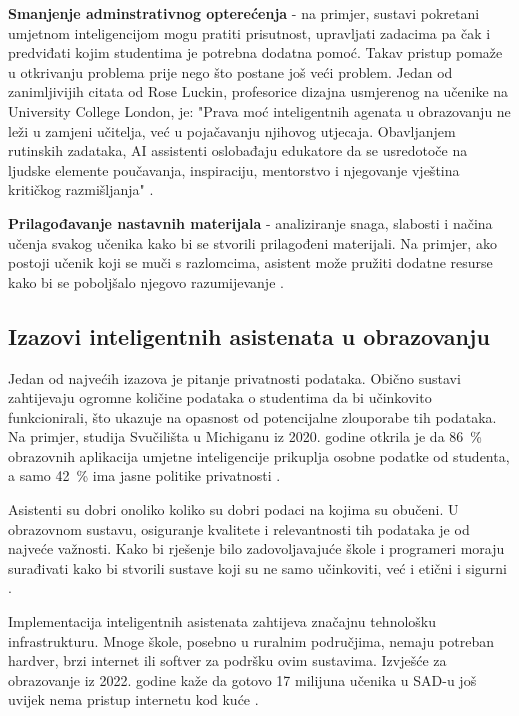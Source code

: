 \documentclass[]{foi}
\begin{document}
    \textbf{Smanjenje adminstrativnog opterećenja} - na primjer, sustavi pokretani umjetnom inteligencijom mogu pratiti prisutnost, upravljati zadacima pa čak i predviđati kojim
    studentima je potrebna dodatna pomoć. Takav pristup pomaže u otkrivanju problema prije nego što postane još veći problem. Jedan od zanimljivijih citata od Rose Luckin, profesorice dizajna
    usmjerenog na učenike na University College London, je: "Prava moć inteligentnih agenata u obrazovanju ne leži u zamjeni učitelja, već u pojačavanju njihovog utjecaja. Obavljanjem rutinskih
    zadataka, AI assistenti oslobađaju edukatore da se usredotoče na ljudske elemente poučavanja, inspiraciju, mentorstvo i njegovanje vještina kritičkog razmišljanja" \cite{weber2025smythos}. 
    
    
    \textbf{Prilagođavanje nastavnih materijala}   - analiziranje snaga, slabosti i načina učenja svakog učenika kako bi se stvorili prilagođeni materijali. Na primjer, ako postoji
    učenik koji se muči s razlomcima, asistent može pružiti dodatne resurse kako bi se poboljšalo njegovo razumijevanje \cite{weber2025smythos}.


\subsection{Izazovi inteligentnih asistenata u obrazovanju}

Jedan od najvećih izazova je pitanje privatnosti podataka. Obično sustavi zahtijevaju ogromne količine podataka o studentima da bi učinkovito funkcionirali, što ukazuje na opasnost od 
potencijalne zlouporabe tih podataka. Na primjer, studija Svučilišta u Michiganu iz 2020. godine otkrila je da 86 \,\% obrazovnih aplikacija umjetne inteligencije prikuplja osobne podatke od studenta,
a samo 42 \,\% ima jasne politike privatnosti \cite{weber2025smythos}.

Asistenti su dobri onoliko koliko su dobri podaci na kojima su obučeni. U obrazovnom sustavu, osiguranje kvalitete i relevantnosti tih podataka je od najveće važnosti.
Kako bi rješenje bilo zadovoljavajuće škole i programeri moraju surađivati kako bi stvorili sustave koji su ne samo učinkoviti, već i etični i sigurni \cite{weber2025smythos}.

Implementacija inteligentnih asistenata zahtijeva značajnu tehnološku infrastrukturu. Mnoge škole, posebno u ruralnim područjima, nemaju potreban hardver, brzi internet ili softver za podršku ovim sustavima.
Izvješće za obrazovanje iz 2022. godine kaže da gotovo 17 milijuna učenika u SAD-u još uvijek nema pristup internetu kod kuće \cite{weber2025smythos}.
\end{document}

